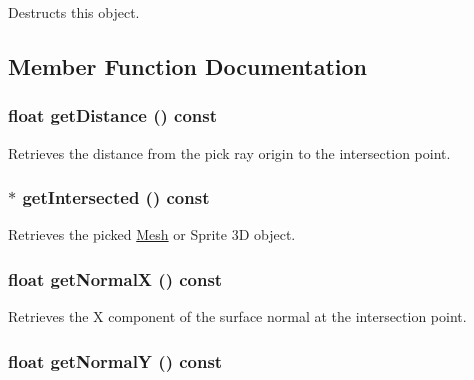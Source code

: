 Destructs this object. 

\subsection{Member Function Documentation}
\hypertarget{classm3g_1_1RayIntersection_f024301f51d2ef67cac50e3255a49612}{
\subsubsection[{getDistance}]{\setlength{\rightskip}{0pt plus 5cm}float getDistance () const}}
\label{classm3g_1_1RayIntersection_f024301f51d2ef67cac50e3255a49612}


Retrieves the distance from the pick ray origin to the intersection point. \hypertarget{classm3g_1_1RayIntersection_cbf90cea6001c33cc03b5a737b312f62}{
\subsubsection[{getIntersected}]{ $\ast$ getIntersected () const}}
\label{classm3g_1_1RayIntersection_cbf90cea6001c33cc03b5a737b312f62}


Retrieves the picked \hyperlink{classm3g_1_1Mesh}{Mesh} or Sprite 3D object. \hypertarget{classm3g_1_1RayIntersection_0ee7a8fab5e001b131bd3109da8af7fa}{
\subsubsection[{getNormalX}]{\setlength{\rightskip}{0pt plus 5cm}float getNormalX () const}}
\label{classm3g_1_1RayIntersection_0ee7a8fab5e001b131bd3109da8af7fa}


Retrieves the X component of the surface normal at the intersection point. \hypertarget{classm3g_1_1RayIntersection_1e05e3b3e8d6b46462812e4713a63d18}{
\subsubsection[{getNormalY}]{\setlength{\rightskip}{0pt plus 5cm}float getNormalY () const}}
\label{classm3g_1_1RayIntersection_1e05e3b3e8d6b46462812e4713a63d18}


